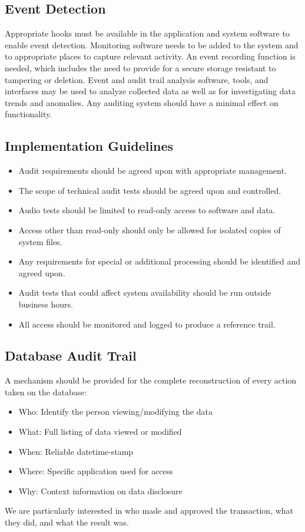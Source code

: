 \documentclass{math}
\begin{document}
\subsection*{Event Detection}
Appropriate hooks must be available in the application and system software to
enable event detection. Monitoring software needs to be added to the system and
to appropriate places to capture relevant activity. An event recording function
is needed, which includes the need to provide for a secure storage resistant to
tampering or deletion. Event and audit trail analysis software, tools, and
interfaces may be used to analyze collected data as well as for investigating
data trends and anomalies. Any auditing system should have a minimal effect on
functionality.

\subsection*{Implementation Guidelines}
\begin{itemize}
  \item Audit requirements should be agreed upon with appropriate management.
  \item The scope of technical audit tests should be agreed upon and controlled.
  \item Audio tests should be limited to read-only access to software and data.
  \item Access other than read-only should only be allowed for isolated copies
  of system files.
  \item Any requirements for special or additional processing should be
  identified and agreed upon.
  \item Audit tests that could affect system availability should be run outside
  business hours.
  \item All access should be monitored and logged to produce a reference trail.
\end{itemize}

\subsection*{Database Audit Trail}
A mechanism should be provided for the complete reconstruction of every action
taken on the database:
\begin{itemize}
  \item Who: Identify the person viewing/modifying the data
  \item What: Full listing of data viewed or modified
  \item When: Reliable datetime-stamp
  \item Where: Specific application used for access
  \item Why: Context information on data disclosure
\end{itemize}
We are particularly interested in who made and approved the transaction,
what they did, and what the result was.
\end{document}
